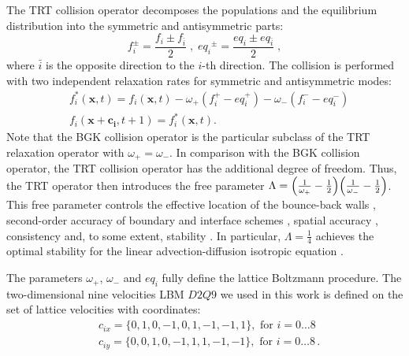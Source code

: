 \documentclass{article}
\newcommand{\beqal}{\begin{equation}\begin{aligned}}
\newcommand{\feqal}{\end{aligned}\end{equation}}
\newcommand{\omegaplus}{\omega_{+}}
\newcommand{\omegaminus}{\omega_{-}}
\begin{document}
The TRT collision operator \cite{ginzburg-boundary-main}
decomposes the populations and the equilibrium
distribution into the symmetric and antisymmetric parts:
\begin{equation}
\label{trtdecomp}
f^{\pm}_i=\frac{f_i\pm f_{\bar{i}}}{2}\;,\; 
{eq_i}^{\pm}=\frac{eq_i\pm eq_{\bar{i}}}{2}\;,
\end{equation}
where $\bar{i}$ is the opposite direction to the $i$-th direction.
The collision is performed with two independent relaxation rates for 
symmetric and antisymmetric modes:
\begin{equation}
\label{trt}
\begin{aligned}
&f_i^{*}(\bm{x},t)=f_i(\bm{x},t)-\omegaplus (f_i^{+} - eq_i^+)-\omegaminus
(f_i^{-} -
eq_i^-)\\
&f_i(\bm{x}+\bm{c_i},t+1)=f_i^{*}(\bm{x},t).
\end{aligned}
\end{equation}
Note that the BGK collision operator is the particular subclass of the TRT relaxation operator with
$\omegaplus=\omegaminus$. In comparison with the BGK collision operator,
the TRT collision operator has the additional degree of freedom. Thus, the TRT operator then
introduces
the free parameter
$\Lambda=\Bigl(\frac{1}{\omegaplus}-\frac{1}{2}\Bigr)\Bigl(\frac{1}{\omegaminus}-\frac{1}{2}
\Bigr)$. 
This free parameter controls the effective location of the bounce-back
walls \cite{ginzburg-multireflection}, second-order accuracy of
boundary \cite{ginzburg-boundary-main} and interface schemes \cite{ginzburg-discontinious}, 
spatial accuracy \cite{ginzburg-recurrence,servan-trt-stability},
consistency \cite{ginzburg-brinkman} and, to some extent,
stability \cite{kuzmin-stability-optimal,kuzmin-d1q3,servan-trt-stability}.
In particular, $\Lambda=\frac{1}{4}$ achieves the optimal stability for the
linear advection-diffusion isotropic equation \cite{kuzmin-stability-optimal}. 

The parameters $\omegaplus$, $\omegaminus$ and $eq_i$ fully define the lattice Boltzmann
procedure. The two-dimensional nine velocities LBM $D2Q9$ we used in this work is defined on the set
of lattice
velocities with coordinates:
\beqal
&c_{ix}=\{0,1,0,-1,0,1,-1,-1,1\},\text{ for } i=0\dots8\\
&c_{iy}=\{0,0,1,0,-1,1,1,-1,-1\},\text{ for } i=0\dots8\,.
\feqal
\end{document}
